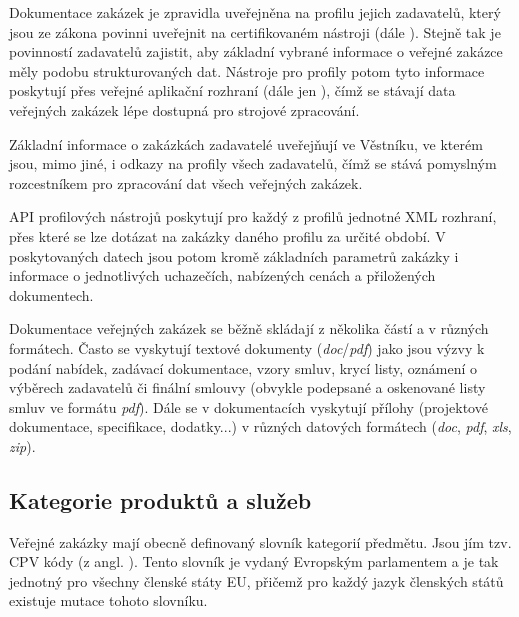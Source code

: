\documentclass[thesis=M,czech]{FITthesis}[2019/12/23]
\begin{document}
Dokumentace zakázek je zpravidla uveřejněna na profilu jejich zadavatelů, který jsou ze zákona povinni uveřejnit na certifikovaném nástroji (dále )\cite{vhodneuverejneniFAQ}. Stejně tak je povinností zadavatelů zajistit, aby základní vybrané informace o veřejné zakázce měly podobu strukturovaných dat\cite{isvz2}. Nástroje pro profily potom tyto informace poskytují přes veřejné aplikační rozhraní (dále jen ), čímž se stávají data veřejných zakázek lépe dostupná pro strojové zpracování.

Základní informace o zakázkách zadavatelé uveřejňují ve Věstníku, ve kterém jsou, mimo jiné, i odkazy na profily všech zadavatelů, čímž se stává pomyslným rozcestníkem pro zpracování dat všech veřejných zakázek.

API profilových nástrojů poskytují pro každý z profilů jednotné XML rozhraní, přes které se lze dotázat na zakázky daného profilu za určité období. V poskytovaných datech jsou potom kromě základních parametrů zakázky i informace o jednotlivých uchazečích, nabízených cenách a přiložených dokumentech.

Dokumentace veřejných zakázek se běžně skládají z několika částí a v různých formátech. Často se vyskytují textové dokumenty (\textit{doc}/\textit{pdf}) jako jsou výzvy k podání nabídek, zadávací dokumentace, vzory smluv, krycí listy, oznámení o výběrech zadavatelů či finální smlouvy (obvykle podepsané a oskenované listy smluv ve formátu \textit{pdf}). Dále se v dokumentacích vyskytují přílohy (projektové dokumentace, specifikace, dodatky...) v různých datových formátech (\textit{doc}, \textit{pdf}, \textit{xls}, \textit{zip}).

\subsection{Kategorie produktů a služeb}

Veřejné zakázky mají obecně definovaný slovník kategorií předmětu. Jsou jím tzv. CPV kódy (z angl. ). Tento slovník je vydaný Evropským parlamentem a je tak jednotný pro všechny členské státy EU, přičemž pro každý jazyk členských států existuje mutace tohoto slovníku.
\end{document}
